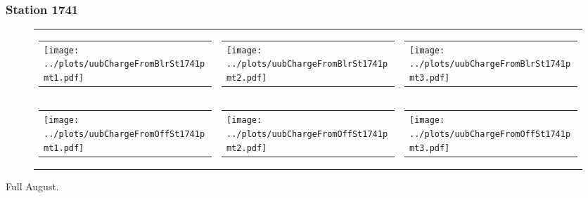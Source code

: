 \documentclass[aspectratio=169]{beamer}
\begin{document}
\begin{frame} 
  \frametitle{Station 1741}
 
  \begin{figure}
    \centering
    \begin{tabularx}{\textwidth}{LCR}
      \begin{tabular}{l}
        \texttt{[image: ../plots/uubChargeFromBlrSt1741pmt1.pdf]}
      \end{tabular}
      &
      \begin{tabular}{l}
        \texttt{[image: ../plots/uubChargeFromBlrSt1741pmt2.pdf]}
      \end{tabular}
      &
      \begin{tabular}{l}
        \texttt{[image: ../plots/uubChargeFromBlrSt1741pmt3.pdf]}
      \end{tabular}
      \\
      \begin{tabular}{l}
        \texttt{[image: ../plots/uubChargeFromOffSt1741pmt1.pdf]}
      \end{tabular}
      &
      \begin{tabular}{l}
        \texttt{[image: ../plots/uubChargeFromOffSt1741pmt2.pdf]}
      \end{tabular}
      &
      \begin{tabular}{l}
        \texttt{[image: ../plots/uubChargeFromOffSt1741pmt3.pdf]}
      \end{tabular}
    \end{tabularx}
  \end{figure}
  Full August. 
\end{frame}
\end{document}
